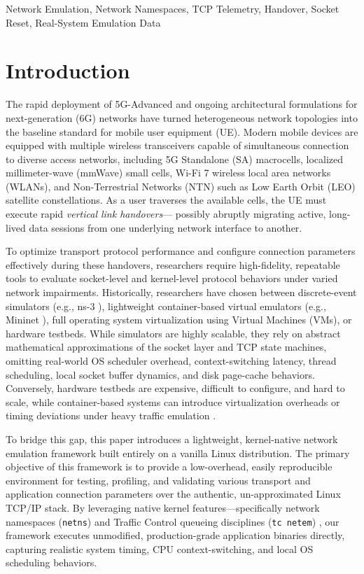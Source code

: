 \documentclass[conference]{IEEEtran}
\begin{document}

\begin{IEEEkeywords}
Network Emulation, Network Namespaces, TCP Telemetry, Handover, Socket Reset, Real-System Emulation Data
\end{IEEEkeywords}


\section{Introduction}
The rapid deployment of 5G-Advanced and ongoing architectural formulations for next-generation (6G) networks have turned heterogeneous network topologies into the baseline standard for mobile user equipment (UE). Modern mobile devices are equipped with multiple wireless transceivers capable of simultaneous connection to diverse access networks, including 5G Standalone (SA) macrocells, localized millimeter-wave (mmWave) small cells, Wi-Fi 7 wireless local area networks (WLANs), and Non-Terrestrial Networks (NTN) such as Low Earth Orbit (LEO) satellite constellations. As a user traverses the available cells, the UE must execute rapid \textit{vertical link handovers}— possibly abruptly migrating active, long-lived data sessions from one underlying network interface to another. 

To optimize transport protocol performance and configure connection parameters effectively during these handovers, researchers require high-fidelity, repeatable tools to evaluate socket-level and kernel-level protocol behaviors under varied network impairments. Historically, researchers have chosen between discrete-event simulators (e.g., ns-3 \cite{henderson2008ns3}), lightweight container-based virtual emulators (e.g., Mininet \cite{heller2010mininet}), full operating system virtualization using Virtual Machines (VMs), or hardware testbeds. While simulators are highly scalable, they rely on abstract mathematical approximations of the socket layer and TCP state machines, omitting real-world OS scheduler overhead, context-switching latency, thread scheduling, local socket buffer dynamics, and disk page-cache behaviors. Conversely, hardware testbeds are expensive, difficult to configure, and hard to scale, while container-based systems can introduce virtualization overheads or timing deviations under heavy traffic emulation \cite{nussbaum2009linux}.

To bridge this gap, this paper introduces a lightweight, kernel-native network emulation framework built entirely on a vanilla Linux distribution. The primary objective of this framework is to provide a low-overhead, easily reproducible environment for testing, profiling, and validating various transport and application connection parameters over the authentic, un-approximated Linux TCP/IP stack. By leveraging native kernel features—specifically network namespaces (\texttt{netns}) 
 \cite{biederman2006multiple} and Traffic Control queueing disciplines (\texttt{tc netem}) \cite{hemminger2005netem}, our framework executes unmodified, production-grade application binaries directly, capturing realistic system timing, CPU context-switching, and local OS scheduling behaviors.
\end{document}
